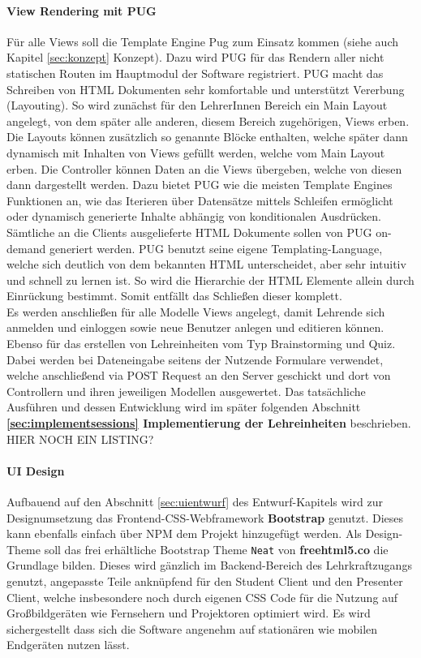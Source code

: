  \paragraph{View Rendering mit PUG}
Für alle Views soll die Template Engine Pug zum Einsatz kommen (siehe auch Kapitel \ref{sec:konzept} Konzept). Dazu wird PUG für das Rendern aller nicht statischen Routen im Hauptmodul der Software registriert. PUG macht das Schreiben von HTML Dokumenten sehr komfortable und unterstützt Vererbung (Layouting). So wird zunächst für den LehrerInnen Bereich ein Main Layout angelegt, von dem später alle anderen, diesem Bereich zugehörigen, Views erben. Die Layouts können zusätzlich so genannte Blöcke enthalten, welche später dann dynamisch mit Inhalten von Views gefüllt werden, welche vom Main Layout erben. Die Controller können Daten an die Views übergeben, welche von diesen dann dargestellt werden. Dazu bietet PUG wie die meisten Template Engines Funktionen an, wie das Iterieren über Datensätze mittels Schleifen ermöglicht oder dynamisch generierte Inhalte abhängig von konditionalen Ausdrücken. Sämtliche an die Clients ausgelieferte HTML Dokumente sollen von PUG on-demand generiert werden. PUG benutzt seine eigene Templating-Language, welche sich deutlich von dem bekannten HTML unterscheidet, aber sehr intuitiv und schnell zu lernen ist. So wird die Hierarchie der HTML Elemente allein durch Einrückung bestimmt. Somit entfällt das Schließen dieser komplett. \\ 
Es werden anschließen für alle Modelle Views angelegt, damit Lehrende sich anmelden und einloggen sowie neue Benutzer anlegen und editieren können. Ebenso für das erstellen von Lehreinheiten vom Typ Brainstorming und Quiz. Dabei werden bei Dateneingabe seitens der Nutzende Formulare verwendet, welche anschließend via POST Request an den Server geschickt und dort von Controllern und ihren jeweiligen Modellen ausgewertet. Das tatsächliche Ausführen und dessen Entwicklung wird im später folgenden Abschnitt \textbf{\ref{sec:implementsessions} Implementierung der Lehreinheiten} beschrieben. 
\\ 
HIER NOCH EIN LISTING?
\paragraph{UI Design}
Aufbauend auf den Abschnitt \ref{sec:uientwurf} des Entwurf-Kapitels wird zur Designumsetzung das Frontend-CSS-Webframework \textbf{Bootstrap} genutzt. Dieses kann ebenfalls einfach über NPM dem Projekt hinzugefügt werden. Als Design-Theme soll das frei erhältliche Bootstrap Theme \texttt{Neat} von \textbf{freehtml5.co} die Grundlage bilden. Dieses wird gänzlich im Backend-Bereich des Lehrkraftzugangs genutzt, angepasste Teile anknüpfend für den Student Client und den Presenter Client, welche insbesondere noch durch eigenen CSS Code für die Nutzung auf Großbildgeräten wie Fernsehern und Projektoren optimiert wird. Es wird sichergestellt dass sich die Software angenehm auf stationären wie mobilen Endgeräten nutzen lässt. 

